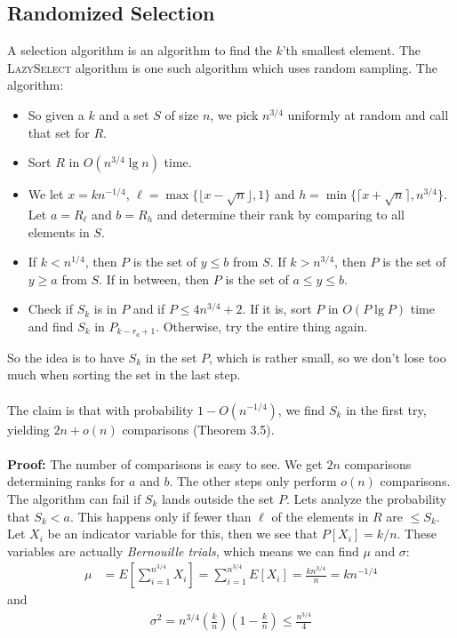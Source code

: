 \documentclass[a4paper, fleqn]{article}
\begin{document}
\subsection*{Randomized Selection}
A selection algorithm is an algorithm to find the $k$'th smallest element. The \textsc{LazySelect} algorithm is one such algorithm which uses random sampling. The algorithm:
\begin{itemize}
  \item So given a $k$ and a set $S$ of size $n$, we pick $n^{3/4}$ uniformly at random and call that set for $R$.
  \item Sort $R$ in $O(n^{3/4}\lg n)$ time.
  \item We let $x=kn^{-1/4}$, $\ell=\max \{\lfloor x-\sqrt{n}\rfloor, 1\}$ and $h=\min\{\lceil x+\sqrt{n}\rceil, n^{3/4}\}$. Let $a=R_{\ell}$ and $b=R_h$ and determine their rank by comparing to all elements in $S$.
  \item If $k<n^{1/4}$, then $P$ is the set of $y\leq b$ from $S$. If $k>n^{3/4}$, then $P$ is the set of $y\geq a$ from $S$. If in between, then $P$ is the set of $a\leq y\leq b$.
  \item Check if $S_k$ is in $P$ and if $P\leq 4n^{3/4}+2$. If it is, sort $P$ in $O(P\lg P)$ time and find $S_k$ in $P_{k-r_a+1}$. Otherwise, try the entire thing again.
\end{itemize}
So the idea is to have $S_k$ in the set $P$, which is rather small, so we don't lose too much when sorting the set in the last step.\\
\\
The claim is that with probability $1-O(n^{-1/4})$, we find $S_k$ in the first try, yielding $2n+o(n)$ comparisons (Theorem 3.5).\\
\\
\textbf{Proof:} The number of comparisons is easy to see. We get $2n$ comparisons determining ranks for $a$ and $b$. The other steps only perform $o(n)$ comparisons. The algorithm can fail if $S_k$ lands outside the set $P$. Lets analyze the probability that $S_k<a$. This happens only if fewer than $\ell$ of the elements in $R$ are $\leq S_k$. Let $X_i$ be an indicator variable for this, then we see that $P[X_i]=k/n$. These variables are actually \textit{Bernouille trials}, which means we can find $\mu$ and $\sigma$:
\begin{align*}
  \mu&=E\left[ \sum_{i=1}^{n^{3/4}} X_i \right] = \sum_{i=1}^{n^{3/4}} E[X_i] =\frac{kn^{3/4}}{n}=kn^{-1/4}
\end{align*}
and
\begin{align*}
  \sigma^2 = n^{3/4}\left( \frac{k}{n} \right) \left( 1-\frac{k}{n} \right) \leq \frac{n^{3/4}}{4}
\end{align*}
\end{document}
